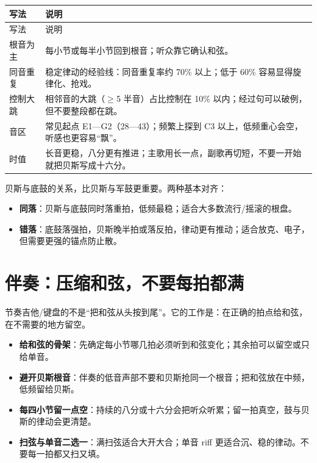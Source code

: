 \begin{longtable}{p{}p{}}
\toprule
写法 & 说明 \\
\midrule
\endfirsthead
\toprule
写法 & 说明 \\
\midrule
\endhead
根音为主 & 每小节或每半小节回到根音；听众靠它确认和弦。 \\
同音重复 & 稳定律动的经验线：同音重复率约 70\% 以上；低于 60\% 容易显得旋律化、抢戏。 \\
控制大跳 & 相邻音的大跳（$\geq$5 半音）占比控制在 10\% 以内；经过句可以破例，但不要整段都在跳。 \\
音区 & 常见起点 E1—G2（28—43）；频繁上探到 C3 以上，低频重心会空，听感也更容易“飘”。 \\
时值 & 长音更稳，八分更有推进；主歌用长一点，副歌再切短，不要一开始就把贝斯写成十六分。 \\
\bottomrule
\end{longtable}

贝斯与底鼓的关系，比贝斯与军鼓更重要。两种基本对齐：

\begin{itemize}
\item \textbf{同落}：贝斯与底鼓同时落重拍，低频最稳；适合大多数流行/摇滚的根盘。
\item \textbf{错落}：底鼓落强拍，贝斯晚半拍或落反拍，律动更有推动；适合放克、电子，但需要更强的锚点防止散。
\end{itemize}

\section{伴奏：压缩和弦，不要每拍都满}
\label{sec:comping}

节奏吉他/键盘的不是“把和弦从头按到尾”。它的工作是：在正确的拍点给和弦，在不需要的地方留空。

\begin{itemize}
\item \textbf{给和弦的骨架}：先确定每小节哪几拍必须听到和弦变化；其余拍可以留空或只给单音。
\item \textbf{避开贝斯根音}：伴奏的低音声部不要和贝斯抢同一个根音；把和弦放在中频，低频留给贝斯。
\item \textbf{每四小节留一点空}：持续的八分或十六分会把听众听累；留一拍真空，鼓与贝斯的律动会更清楚。
\item \textbf{扫弦与单音二选一}：满扫弦适合大开大合；单音 riff 更适合沉、稳的律动。不要每一拍都又扫又填。
\end{itemize}

